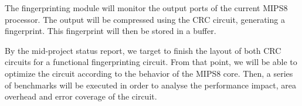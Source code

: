 \documentclass[dvips,12pt]{article}
\begin{document}
The fingerprinting module will monitor the output ports of the current MIPS8 processor. 
The output will be compressed using the CRC circuit, generating a fingerprint. This fingerprint will then be
stored in a buffer.

By the mid-project status report, we target to finish the layout of both CRC circuits for a functional
fingerprinting circuit. From that point, we will be able to optimize the circuit according to the behavior
of the MIPS8 core. Then, a series of benchmarks will be executed in order to analyse the performance
impact, area overhead and error coverage of the circuit.
\end{document}
